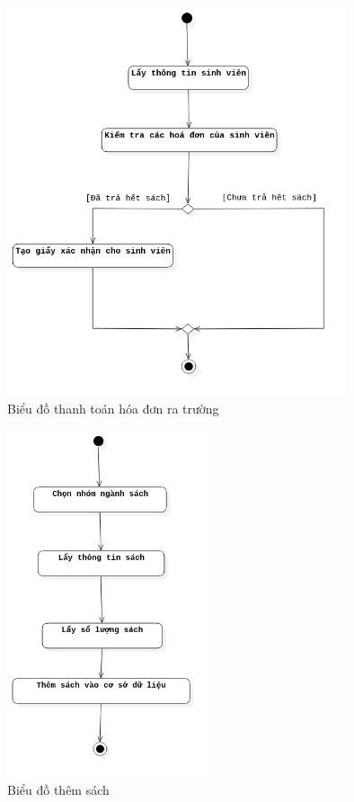 \documentclass[../report.tex]{subfiles}
\begin{document}
\begin{figure}[H]
\centering
\includegraphics[width=10cm]{figures/thanhtoanratruong.png}
\caption{Biểu đồ thanh toán hóa đơn ra trường}
\end{figure}

\begin{figure}[H]
\centering
\includegraphics[width=6cm]{figures/themsach.png}
\caption{Biểu đồ thêm sách}
\end{figure}
\end{document}
